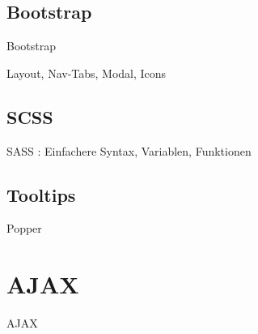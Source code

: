 \subsection{Bootstrap}

Bootstrap

Layout, Nav-Tabs, Modal, Icons

\subsection{SCSS}

SASS \cite{sass}: Einfachere Syntax, Variablen, Funktionen

\subsection{Tooltips}

Popper \cite{popperjs}

\section{AJAX}

AJAX \cite{garrett2005ajax}

\begin{figure}[H]
    \centering
    \setlength{\fboxsep}{10pt}\color{black!20}
    \normalcolor
\end{figure}

\begin{figure}[H]
    \centering
    \setlength{\fboxsep}{10pt}\color{black!20}
    \normalcolor\caption{\cite{garrett2005ajax}}
\end{figure}


